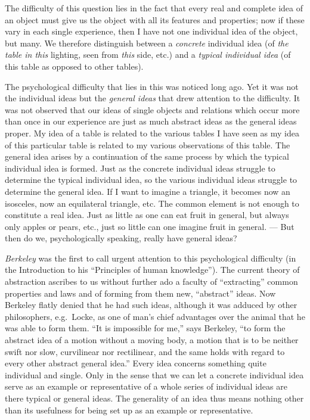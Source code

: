 \documentclass[12pt,a4paper]{book}
\newcommand{\opage}[1]{\marginnote{\footnotesize\textit{[#1]}}}
\begin{document}
The difficulty of this question lies in the fact that every real and
complete idea of an object must give us the object with all its features
and properties; now if these vary in each single experience, then I have
not one individual idea of the object, but many. We therefore
distinguish between a \emph{concrete} individual idea (of \emph{the
table in this} lighting, seen from \emph{this} side, etc.) and a
\emph{typical individual idea} (of this table as opposed to other
tables).

The psychological difficulty that lies in this was noticed long ago. Yet
it was not the individual ideas but the \emph{general ideas} that drew
attention to the difficulty. It was not observed that our ideas of
single objects and relations which occur more than once in our
experience are just as much abstract ideas as the general ideas proper.
My idea of a table is related to the various tables I have seen as my
idea of this particular table is related to my various observations of
this table. The general idea arises by a continuation of the same
process by which the typical individual idea is formed. Just as the
concrete individual ideas struggle to determine the typical individual
idea, so the various individual ideas struggle to determine the general
idea. If I want to imagine a triangle, it becomes now an isosceles, now
an equilateral triangle, etc. The common element is not enough to
constitute a real idea. Just as little as one can eat fruit in general,
but always only apples or pears, etc., just so little can one imagine
fruit in general. --- But then do we, psychologically speaking, really
have general ideas?

\opage{202}\emph{Berkeley} was the first to call urgent attention to
this psychological difficulty (in the Introduction to his ``Principles
of human knowledge''). The current theory of abstraction ascribes to us
without further ado a faculty of ``extracting'' common properties and
laws and of forming from them new, ``abstract'' ideas. Now Berkeley
flatly denied that he had such ideas, although it was adduced by other
philosophers, e.g.\ Locke, as one of man's chief advantages over the
animal that he was able to form them. ``It is impossible for me,'' says
Berkeley, ``to form the abstract idea of a motion without a moving body,
a motion that is to be neither swift nor slow, curvilinear nor
rectilinear, and the same holds with regard to every other abstract
general idea.'' Every idea concerns something quite individual and
single. Only in the sense that we can let a concrete individual idea
serve as an example or representative of a whole series of individual
ideas are there typical or general ideas. The generality of an idea thus
means nothing other than its usefulness for being set up as an example
or representative.
\end{document}
